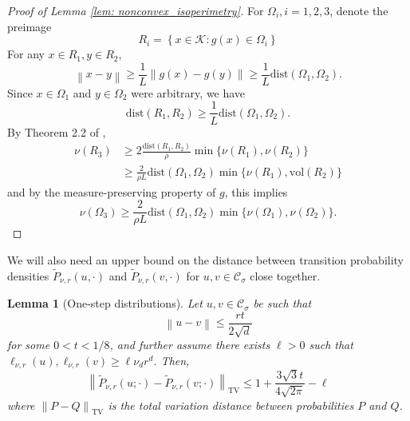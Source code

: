 \documentclass[11pt,twoside]{article}
\newtheorem{lemma}{Lemma}
\newcommand{\set}[1]{\left\{#1\right\}}
\newcommand{\vol}{\mathrm{vol}}
\newcommand{\norm}[1]{\left\lVert#1\right\rVert}
\newcommand{\1}{\mathbf{1}}
\newcommand{\dist}{\mathrm{dist}}
\newcommand{\Cset}{\mathcal{C}}
\newcommand{\Csig}{\Cset_{\sigma}}
\begin{document}
\begin{proof}[Proof of Lemma \ref{lem: nonconvex_isoperimetry}]
	For $\Omega_i, i = 1,2,3$, denote the preimage
	\begin{equation*}
	R_i = \set{x \in \mathcal{K}: g(x) \in \Omega_i}
	\end{equation*}
	For any $x \in R_1, y \in R_2$, 
	\begin{equation*}
	\norm{x - y} \geq \frac{1}{L}\norm{g(x) - g(y)} \geq \frac{1}{L} \dist(\Omega_1, \Omega_2). 
	\end{equation*}
	Since $x \in \Omega_1$ and $y \in \Omega_2$ were arbitrary, we have
	\begin{equation*}
	\dist(R_1, R_2) \geq \frac{1}{L} \dist(\Omega_1, \Omega_2).
	\end{equation*}
	By Theorem 2.2 of \cite{lovasz1990},
	\begin{align*}
	\nu(R_3) & \geq 2\frac{\dist(R_1, R_2)}{\rho} \min \{\nu(R_1), \nu(R_2)\} \\
	& \geq \frac{2}{\rho L} \dist(\Omega_1, \Omega_2) \min\{\nu(R_1), \vol(R_2)\}
	\end{align*}
	and by the measure-preserving property of $g$, this implies
	\begin{equation*}
	\nu(\Omega_3) \geq\frac{2}{\rho L} \dist(\Omega_1, \Omega_2) \min\{\nu(\Omega_1), \nu(\Omega_2)\}.
	\end{equation*}
\end{proof}

We will also need an upper bound on the distance between transition probability densities $\widetilde{P}_{\nu,r}(u,\cdot)$ and $\widetilde{P}_{\nu,r}(v,\cdot)$ for $u,v \in \Csig$ close together. 
\begin{lemma}[One-step distributions]
	\label{lem: one_step_distributions}
	Let $u,v \in \Csig$ be such that 
	\begin{equation*}
	\norm{u - v} \leq \frac{r t}{2\sqrt{d}}
	\end{equation*}
	for some $0 < t < 1/8$, and further assume there exists $\ell > 0$ such that $\ell_{\nu,r}(u), \ell_{\nu,r}(v) \geq \ell \nu_d r^d$. Then,
	\begin{equation*}
	\norm{\widetilde{P}_{\nu,r}(u; \cdot) - \widetilde{P}_{\nu,r}(v; \cdot)}_{\mathrm{TV}} \leq 1 + \frac{3 \sqrt{3} t}{4\sqrt{2\pi}} - \ell
	\end{equation*}
	where $\norm{P - Q}_{\mathrm{TV}}$ is the total variation distance between probabilities $P$ and $Q$. 
\end{lemma}
\end{document}

